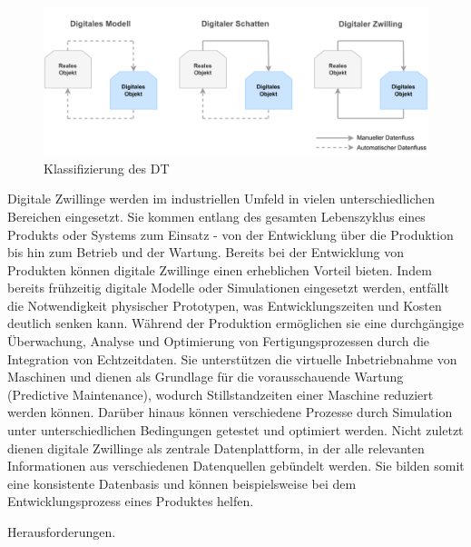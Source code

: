 
\begin{figure}[htbp]
    \centering
    \includegraphics[width=1\textwidth]{Bilder/klassifizierung_DT.pdf}
    \caption{Klassifizierung des DT}
    \label{fig:klassifizierungDT}
\end{figure}

Digitale Zwillinge werden im industriellen Umfeld in vielen unterschiedlichen Bereichen eingesetzt. 
Sie kommen entlang des gesamten Lebenszyklus eines Produkts oder Systems zum Einsatz - von der Entwicklung über die Produktion bis hin zum Betrieb und der Wartung. 
Bereits bei der Entwicklung von Produkten können digitale Zwillinge einen erheblichen Vorteil bieten. 
Indem bereits frühzeitig digitale Modelle oder Simulationen eingesetzt werden, entfällt die Notwendigkeit physischer Prototypen, was Entwicklungszeiten und Kosten deutlich senken kann. Während der Produktion ermöglichen sie eine durchgängige Überwachung, Analyse und Optimierung von Fertigungsprozessen durch die Integration von Echtzeitdaten.
Sie unterstützen die virtuelle Inbetriebnahme von Maschinen und dienen als Grundlage für die vorausschauende Wartung (Predictive Maintenance), wodurch Stillstandzeiten einer Maschine reduziert werden können.
Darüber hinaus können verschiedene Prozesse durch Simulation unter unterschiedlichen Bedingungen getestet und optimiert werden. 
Nicht zuletzt dienen digitale Zwillinge als zentrale Datenplattform, in der alle relevanten Informationen aus verschiedenen Datenquellen gebündelt werden.
Sie bilden somit eine konsistente Datenbasis und können beispielsweise bei dem Entwicklungsprozess eines Produktes helfen. \cite{DTForSmartManufacturing}


Herausforderungen.





